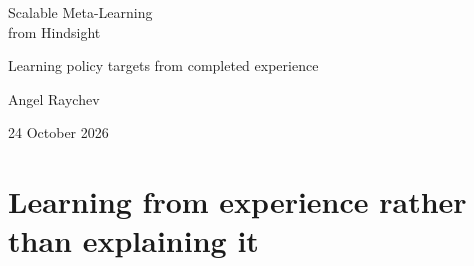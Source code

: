 \documentclass[11pt,letterpaper]{article}
\begin{document}
\thispagestyle{plain}
\begin{center}
{\PublicationTitleFont Scalable Meta-Learning\\[3pt]from Hindsight\par}
\vspace{9pt}
{\large Learning policy targets from completed experience\par}
\vspace{10pt}
{\normalsize Angel Raychev\par}
\vspace{5pt}
{\small\color{muted}24 October 2026\par}
\vspace{6pt}
\end{center}
\vspace{2pt}
\begin{abstract}
\noindent
A completed experience reveals information that was unavailable while an agent acted. We investigate how to turn that information into a parameter update that helps on different tasks. A source-restricted proposer supplies candidate privileged-information contexts; matched student updates measure their learning value; and a future-aware teacher learns to assign the selected policy distributions directly from raw completed experience. This teacher predicts full-vocabulary targets rather than generating a lesson or replacement answer. We implement the distribution, update and black-box proposer-training interfaces, and study their components with Qwen3.5-4B on algorithmic array transformations. On fresh source experiences, hindsight-teacher fitting reduces mean forward KL to selected references from 0.2791 to 0.0583. Contextual lessons are useful, but this fidelity gain does not establish reliable downstream benefit: causal query scores are 30/64 for the fitted-teacher update, 27/64 without updating and 28/64 for an unfitted teacher, with source-cluster intervals spanning zero. An independent distribution audit finds that 98.54\% of summed initial source KL lies in verbal rule text, while corrective targets at erroneous array entries remain weak or unevenly fitted. These results separate contextual utility, distribution assignment and durable student improvement, and motivate optimizing teaching by the learning it actually causes.
\end{abstract}

\section{Learning from experience rather than explaining it}
\end{document}
